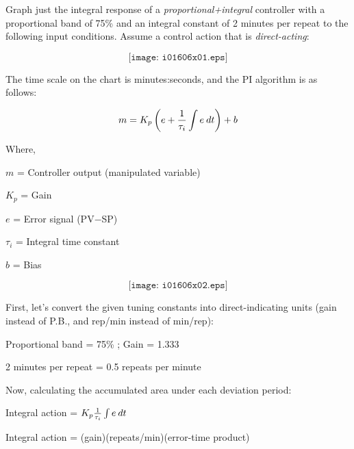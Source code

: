 

Graph just the integral response of a {\it proportional+integral} controller with a proportional band of 75\% and an integral constant of 2 minutes per repeat to the following input conditions.  Assume a control action that is {\it direct-acting}:

$$\texttt{[image: i01606x01.eps]}$$

The time scale on the chart is minutes:seconds, and the PI algorithm is as follows:

$$m = K_p \left( e + {1 \over \tau_i} \int e \> dt \right) + b$$

\noindent
Where,

$m$ = Controller output (manipulated variable)

$K_p$ = Gain

$e$ = Error signal (PV$-$SP)

$\tau_i$ = Integral time constant

$b$ = Bias

\vskip 10pt







$$\texttt{[image: i01606x02.eps]}$$

First, let's convert the given tuning constants into direct-indicating units (gain instead of P.B., and rep/min instead of min/rep):
 
\vskip 10pt

Proportional band = 75\% ; Gain = 1.333
 
\vskip 10pt

2 minutes per repeat = 0.5 repeats per minute
 
\vskip 10pt

\noindent
Now, calculating the accumulated area under each deviation period:
 
\vskip 10pt

Integral action = $K_p {1\over \tau_i} \int e \> dt$
 
\vskip 10pt

Integral action = (gain)(repeats/min)(error-time product)
 
\vskip 10pt

